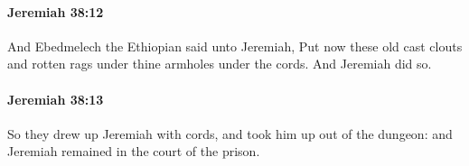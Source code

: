 		\paragraph{Jeremiah 38:12} %
			\label{JEREMIAH-38-12}

			And Ebedmelech the Ethiopian said unto Jeremiah, Put now these old cast clouts and rotten rags under thine armholes under the cords. And Jeremiah did so.


		\paragraph{Jeremiah 38:13} %
			\label{JEREMIAH-38-13}

			So they drew up Jeremiah with cords, and took him up out of the dungeon: and Jeremiah remained in the court of the prison.



